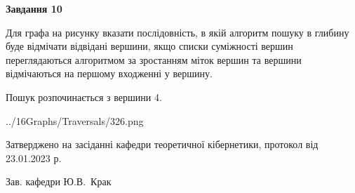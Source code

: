 \documentclass[12pt, ukrainian]{article}
\begin{document}
{\begin {large}
{\begin {center}\textbf{Завдання 10}\end {center}}\par
Для графа на рисунку вказати послідовність, в якій алгоритм пошуку в глибину буде відмічати відвідані вершини, якщо списки суміжності вершин переглядаються алгоритмом за зростанням міток вершин та вершини відмічаються на першому вход\-женні у вершину.\par
Пошук розпочинається з вершини 4.\par

\begin{center}
	{../16Graphs/Traversals/326.png}
\end{center}\par
\newpage


\end {large}
}
{\smallskip \begin {small} Затверджено на засіданні кафедри теоретичної кібернетики, протокол  від   23.01.2023 р.\par\smallskip\smallskip
{\parbox {6.5 cm}{Зав. кафедри \dotfill Ю.В.~Крак}} \end{small}}
\end{document}
